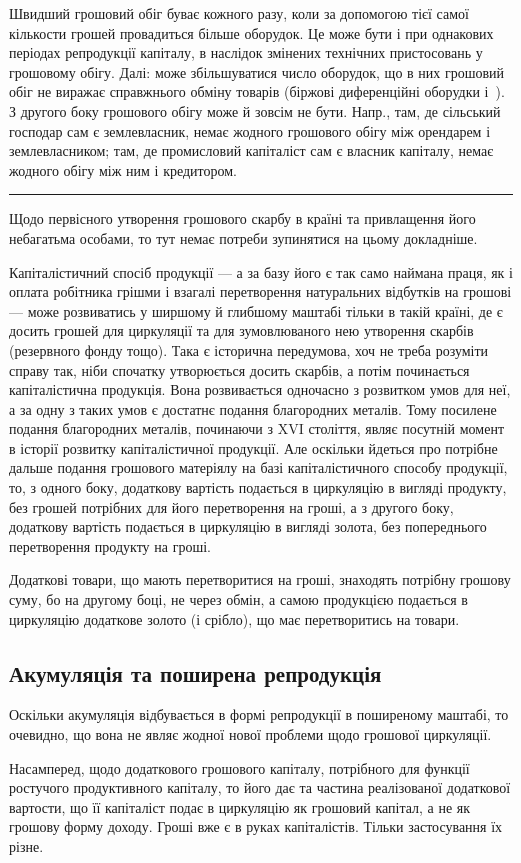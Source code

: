 
Швидший грошовий обіг буває кожного разу, коли за допомогою тієї
самої кількости грошей провадиться більше оборудок. Це може бути і
при однакових періодах репродукції капіталу, в наслідок змінених технічних
пристосовань у грошовому обігу. Далі: може збільшуватися число
оборудок, що в них грошовий обіг не виражає справжнього обміну товарів
(біржові диференційні оборудки і~). З другого боку грошового
обігу може й зовсім не бути. Напр., там, де сільський господар сам є
землевласник, немає жодного грошового обігу між орендарем і землевласником;
там, де промисловий капіталіст сам є власник капіталу, немає
жодного обігу між ним і кредитором.

\bigskip
\fancybreak{*\quad*\quad*}
\bigskip
\noindent{}Щодо первісного утворення грошового скарбу в країні та привлащення
його небагатьма особами, то тут немає потреби зупинятися на
цьому докладніше.

Капіталістичний спосіб продукції — а за базу його є так само наймана
праця, як і оплата робітника грішми і взагалі перетворення натуральних
відбутків на грошові — може розвиватись у ширшому й глибшому маштабі
тільки в такій країні, де є досить грошей для циркуляції та для
зумовлюваного нею утворення скарбів (резервного фонду тощо). Така є
історична передумова, хоч не треба розуміти справу так, ніби спочатку
утворюється досить скарбів, а потім починається капіталістична продукція.
Вона розвивається одночасно з розвитком умов для неї, а за одну з
таких умов є достатнє подання благородних металів. Тому посилене подання
благородних металів, починаючи з XVI століття, являє посутній
момент в історії розвитку капіталістичної продукції. Але оскільки йдеться
про потрібне дальше подання грошового матеріялу на базі капіталістичного
способу продукції, то, з одного боку, додаткову вартість
подається в циркуляцію в вигляді продукту, без грошей потрібних для
його перетворення на гроші, а з другого боку, додаткову вартість подається
в циркуляцію в вигляді золота, без попереднього перетворення
продукту на гроші.

Додаткові товари, що мають перетворитися на гроші, знаходять потрібну
грошову суму, бо на другому боці, не через обмін, а самою продукцією
подається в циркуляцію додаткове золото (і срібло), що має
перетворитись на товари.

\subsection{Акумуляція та поширена репродукція}

Оскільки акумуляція відбувається в формі репродукції в поширеному
маштабі, то очевидно, що вона не являє жодної нової проблеми щодо грошової
циркуляції.

Насамперед, щодо додаткового грошового капіталу, потрібного для
функції ростучого продуктивного капіталу, то його дає та частина реалізованої
додаткової вартости, що її капіталіст подає в циркуляцію як грошовий
капітал, а не як грошову форму доходу. Гроші вже є в руках
капіталістів. Тільки застосування їх різне.
